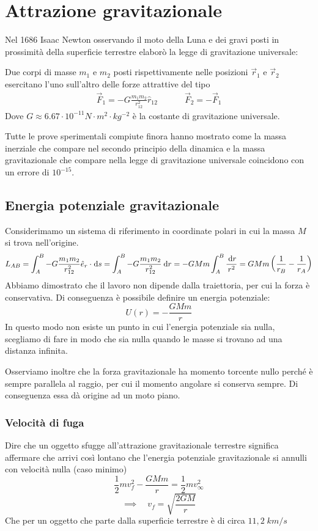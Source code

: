 \documentclass{article}
\theoremstyle{plain}
\begin{document}
\section{Attrazione gravitazionale}
Nel 1686 Isaac Newton osservando il moto della Luna e dei gravi posti in prossimità della superficie terrestre elaborò la legge di gravitazione universale:
\begin{shaded}
    \begin{law}
    Due corpi di masse $m_1$ e $m_2$ posti rispettivamente nelle posizioni $\vec r_1$ e $\vec r_2$ esercitano l'uno sull'altro delle forze attrattive del tipo
    \begin{eqnarray*}\vec F_{1} = - G\frac{m_1m_2}{r_{12}^2}\hat r_{12}&~~~~~~~&\vec F_2=-\vec F_1\end{eqnarray*}
    Dove $G\approx 6.67\cdot 10^{-11}N\cdot m^2\cdot kg^{-2}$ è la costante di gravitazione universale.
\end{law}
\end{shaded}
Tutte le prove sperimentali compiute finora hanno mostrato come la massa inerziale che compare nel secondo principio della dinamica e la massa gravitazionale che compare nella legge di gravitazione universale coincidono con un errore di $10^{-15}$.
\subsection{Energia potenziale gravitazionale}
Considerimamo un sistema di riferimento in coordinate polari in cui la massa $M$ si trova nell'origine. 
\[L_{AB} =\int_A^B - G\frac{m_1m_2}{r_{12}^2}\hat e_r\cdot \!\:\text{d} s =  \int_A^B - G\frac{m_1m_2}{r_{12}^2}\:\text{d} r = - GMm\int_A^B\frac{\:\text{d} r}{r^2} = GMm\left( \frac{1}{r_B} -\frac{1}{r_A} \right)\]
Abbiamo dimostrato che il lavoro non dipende dalla traiettoria, per cui la forza è conservativa. Di conseguenza è possibile definire un energia potenziale:
\[U(r) = - \frac{GMm}{r}\]
In questo modo non esiste un punto in cui l'energia potenziale sia nulla, scegliamo di fare in modo che sia nulla quando le masse si trovano ad una distanza infinita. 

Osserviamo inoltre che la forza gravitazionale ha momento torcente nullo perché è sempre parallela al raggio, per cui il momento angolare si conserva sempre. Di conseguenza essa dà origine ad un moto piano.
\subsubsection{Velocità di fuga}
Dire che un oggetto sfugge all'attrazione gravitazionale terrestre significa affermare che arrivi così lontano che l'energia potenziale gravitazionale si annulli con velocità nulla (caso minimo)
\[\frac{1}{2} mv^2_f -\frac{GMm}{r} = \frac{1}{2}mv^2_{\infty}\]
\[\implies\quad v_f =\sqrt{\frac{2GM}{r} }\]
Che per un oggetto che parte dalla superficie terrestre è di circa $11,2 \;km/s$

\end{document}
